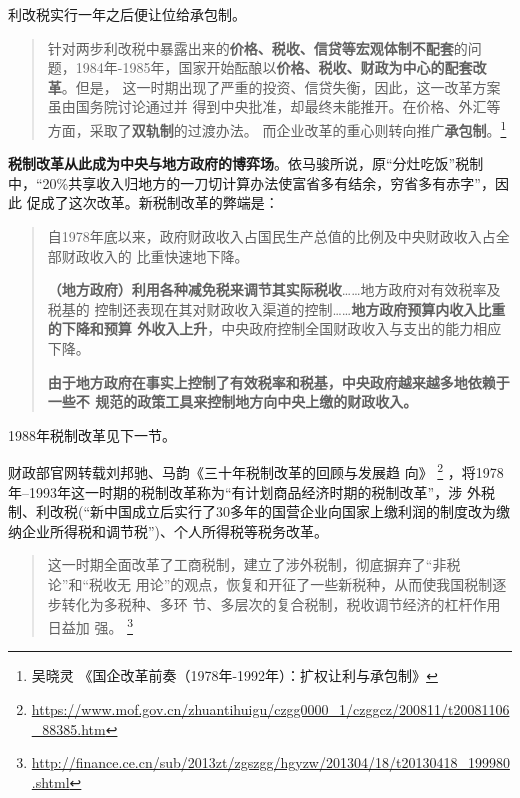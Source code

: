 利改税实行一年之后便让位给承包制。
\begin{quotation}
  针对两步利改税中暴露出来的\textbf{价格、税收、信贷等宏观体制不配套}的问
  题，1984年-1985年，国家开始酝酿以\textbf{价格、税收、财政为中心的配套改革}。但是，
  这一时期出现了严重的投资、信贷失衡，因此，这一改革方案虽由国务院讨论通过并
  得到中央批准，却最终未能推开。在价格、外汇等方面，采取了\textbf{双轨制}的过渡办法。
  而企业改革的重心则转向推广\textbf{承包制}。\footnote{吴晓灵 《国企改革前奏（1978年-1992年）：扩权让利与承包制》}
\end{quotation}


\textbf{税制改革从此成为中央与地方政府的博弈场}。依马骏所说，原“分灶吃饭”税制
中，“20\%共享收入归地方的一刀切计算办法使富省多有结余，穷省多有赤字”，因此
促成了这次改革。新税制改革的弊端是：
\begin{quotation}
  自1978年底以来，政府财政收入占国民生产总值的比例及中央财政收入占全部财政收入的
  比重快速地下降。

  \textbf{（地方政府）利用各种减免税来调节其实际税收}……地方政府对有效税率及税基的
  控制还表现在其对财政收入渠道的控制……\textbf{地方政府预算内收入比重的下降和预算
    外收入上升}，中央政府控制全国财政收入与支出的能力相应下降。

  \textbf{由于地方政府在事实上控制了有效税率和税基，中央政府越来越多地依赖于一些不
    规范的政策工具来控制地方向中央上缴的财政收入。}\cite{majuncaigai}
\end{quotation}


1988年税制改革见下一节。

财政部官网转载刘邦驰、马韵《三十年税制改革的回顾与发展趋
向》
\footnote{\url{https://www.mof.gov.cn/zhuantihuigu/czgg0000_1/czggcz/200811/t20081106_88385.htm}}
，将1978年--1993年这一时期的税制改革称为“有计划商品经济时期的税制改革”，涉
外税制、利改税(“新中国成立后实行了30多年的国营企业向国家上缴利润的制度改为缴
纳企业所得税和调节税”)、个人所得税等税务改革。
\begin{quotation}
  这一时期全面改革了工商税制，建立了涉外税制，彻底摒弃了“非税论”和“税收无
  用论”的观点，恢复和开征了一些新税种，从而使我国税制逐步转化为多税种、多环
  节、多层次的复合税制，税收调节经济的杠杆作用日益加
  强。
  \footnote{\url{http://finance.ce.cn/sub/2013zt/zgszgg/hgyzw/201304/18/t20130418_199980.shtml}}
\end{quotation}

